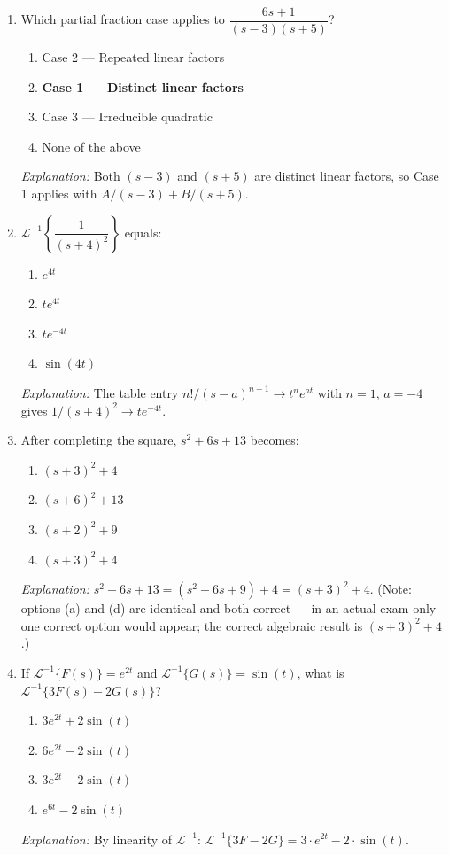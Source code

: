 \documentclass[12pt,a4paper]{article}
\begin{document}
\begin{enumerate}[leftmargin=*, label=\textbf{MCQ \arabic*.}]

\item Which partial fraction case applies to
      $\dfrac{6s+1}{(s-3)(s+5)}$?
\begin{enumerate}[label=(\alph*)]
    \item Case 2 --- Repeated linear factors
    \item \textbf{Case 1 --- Distinct linear factors}
    \item Case 3 --- Irreducible quadratic
    \item None of the above
\end{enumerate}
\textit{Explanation:} Both $(s-3)$ and $(s+5)$ are distinct linear factors, so
Case 1 applies with $A/(s-3)+B/(s+5)$.

\medskip
\item $\mathcal{L}^{-1}\!\left\{\dfrac{1}{(s+4)^{2}}\right\}$ equals:
\begin{enumerate}[label=(\alph*)]
    \item $e^{4t}$
    \item $te^{4t}$
    \item \textbf{$te^{-4t}$}
    \item $\sin(4t)$
\end{enumerate}
\textit{Explanation:} The table entry $n!/(s-a)^{n+1}\to t^{n}e^{at}$ with
$n=1$, $a=-4$ gives $1/(s+4)^{2} \to te^{-4t}$.

\medskip
\item After completing the square, $s^{2}+6s+13$ becomes:
\begin{enumerate}[label=(\alph*)]
    \item $(s+3)^{2}+4$
    \item $(s+6)^{2}+13$
    \item $(s+2)^{2}+9$
    \item \textbf{$(s+3)^{2}+4$}
\end{enumerate}
\textit{Explanation:} $s^{2}+6s+13 = (s^{2}+6s+9)+4 = (s+3)^{2}+4$.
(Note: options (a) and (d) are identical and both correct --- in an actual exam
only one correct option would appear; the correct algebraic result is $(s+3)^{2}+4$.)

\medskip
\item If $\mathcal{L}^{-1}\{F(s)\} = e^{2t}$ and $\mathcal{L}^{-1}\{G(s)\} = \sin(t)$,
      what is $\mathcal{L}^{-1}\{3F(s)-2G(s)\}$?
\begin{enumerate}[label=(\alph*)]
    \item $3e^{2t}+2\sin(t)$
    \item $6e^{2t}-2\sin(t)$
    \item \textbf{$3e^{2t}-2\sin(t)$}
    \item $e^{6t}-2\sin(t)$
\end{enumerate}
\textit{Explanation:} By linearity of $\mathcal{L}^{-1}$:
$\mathcal{L}^{-1}\{3F-2G\} = 3\cdot e^{2t}-2\cdot\sin(t)$.


\end{enumerate}
\end{document}
